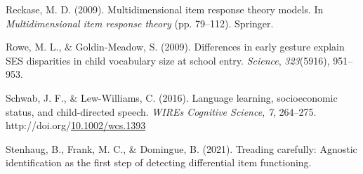 \documentclass[10pt, letterpaper]{article}
\newenvironment{CSLReferences}%
  {}%
  {\par}
\begin{document}
\begin{CSLReferences}{1}{0}
\leavevmode\hypertarget{ref-reckase2009}{}%
Reckase, M. D. (2009). Multidimensional item response theory models. In
\emph{Multidimensional item response theory} (pp. 79--112). Springer.

\leavevmode\hypertarget{ref-rowe2009differences}{}%
Rowe, M. L., \& Goldin-Meadow, S. (2009). Differences in early gesture
explain SES disparities in child vocabulary size at school entry.
\emph{Science}, \emph{323}(5916), 951--953.

\leavevmode\hypertarget{ref-schwab2016}{}%
Schwab, J. F., \& Lew-Williams, C. (2016). Language learning,
socioeconomic status, and child-directed speech. \emph{WIREs Cognitive
Science}, \emph{7}, 264--275.
http://doi.org/\href{https://doi.org/10.1002/wcs.1393}{10.1002/wcs.1393}

\leavevmode\hypertarget{ref-stenhaug2021treading}{}%
Stenhaug, B., Frank, M. C., \& Domingue, B. (2021). Treading carefully:
Agnostic identification as the first step of detecting differential item
functioning.

\end{CSLReferences}


\end{document}
